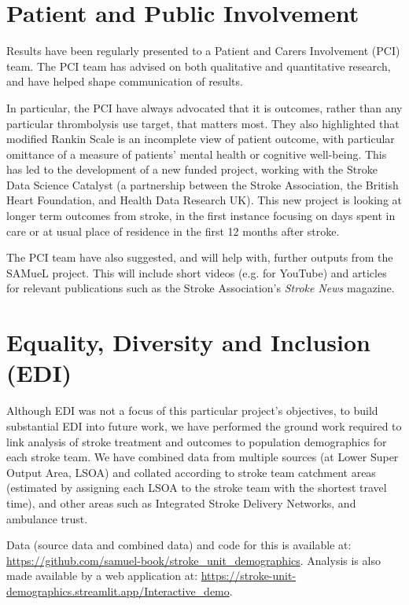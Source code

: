 
\section{Patient and Public Involvement}

Results have been regularly presented to a Patient and Carers Involvement (PCI) team. The PCI team has advised on both qualitative and quantitative research, and have helped shape communication of results.

In particular, the PCI have always advocated that it is outcomes, rather than any particular thrombolysis use target, that matters most. They also highlighted that modified Rankin Scale is an incomplete view of patient outcome, with particular omittance of a measure of patients' mental health or cognitive well-being. This has led to the development of a new funded project, working with the Stroke Data Science Catalyst (a partnership between the Stroke Association, the British Heart Foundation, and Health Data Research UK). This new project is looking at longer term outcomes from stroke, in the first instance focusing on days spent in care or at usual place of residence in the first 12 months after stroke.

The PCI team have also suggested, and will help with, further outputs from the SAMueL project. This will include short videos (e.g. for YouTube) and articles for relevant publications such as the Stroke Association's \textit{Stroke News} magazine.

\section{Equality, Diversity and Inclusion (EDI)}

Although EDI was not a focus of this particular project's objectives, to build substantial EDI into future work, we have performed the ground work required to link analysis of stroke treatment and outcomes to population demographics for each stroke team. We have combined data from multiple sources (at Lower Super Output Area, LSOA) and collated according to stroke team catchment areas (estimated by assigning each LSOA to the stroke team with the shortest travel time), and other areas such as Integrated Stroke Delivery Networks, and ambulance trust.

Data (source data and combined data) and code for this is available at: \url{https://github.com/samuel-book/stroke_unit_demographics}. Analysis is also made available by a web application at: \url{https://stroke-unit-demographics.streamlit.app/Interactive_demo}.

